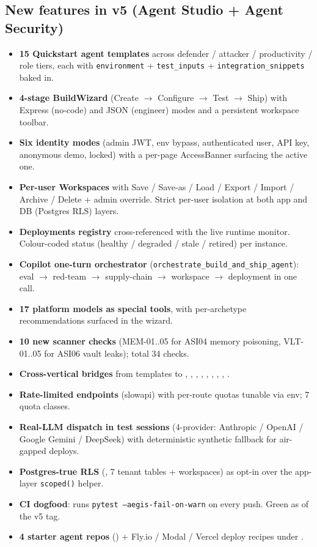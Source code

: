 \documentclass[11pt,a4paper]{article}
\begin{document}
\subsection*{New features in v5 (Agent Studio + Agent Security)}
\begin{itemize}[leftmargin=1.2em,itemsep=1pt]
\item \textbf{15 Quickstart agent templates} across defender / attacker / productivity / role tiers, each with \texttt{environment} + \texttt{test\_inputs} + \texttt{integration\_snippets} baked in.
\item \textbf{4-stage BuildWizard} (Create $\to$ Configure $\to$ Test $\to$ Ship) with Express (no-code) and JSON (engineer) modes and a persistent workspace toolbar.
\item \textbf{Six identity modes} (admin JWT, env bypass, authenticated user, API key, anonymous demo, locked) with a per-page AccessBanner surfacing the active one.
\item \textbf{Per-user Workspaces} with Save / Save-as / Load / Export / Import / Archive / Delete + admin override. Strict per-user isolation at both app and DB (Postgres RLS) layers.
\item \textbf{Deployments registry} cross-referenced with the live runtime monitor. Colour-coded status (healthy / degraded / stale / retired) per instance.
\item \textbf{Copilot one-turn orchestrator} (\texttt{orchestrate\_build\_and\_ship\_agent}): eval $\to$ red-team $\to$ supply-chain $\to$ workspace $\to$ deployment in one call.
\item \textbf{17 platform models as special tools}, with per-archetype recommendations surfaced in the wizard.
\item \textbf{10 new scanner checks} (MEM-01..05 for ASI04 memory poisoning, VLT-01..05 for ASI06 vault leaks); total 34 checks.
\item \textbf{Cross-vertical bridges} from templates to , , , , , , , , .
\item \textbf{Rate-limited endpoints} (slowapi) with per-route quotas tunable via env; 7 quota classes.
\item \textbf{Real-LLM dispatch in test sessions} (4-provider: Anthropic / OpenAI / Google Gemini / DeepSeek) with deterministic synthetic fallback for air-gapped deploys.
\item \textbf{Postgres-true RLS} (, 7 tenant tables + workspaces) as opt-in over the app-layer \texttt{scoped()} helper.
\item \textbf{CI dogfood}:  runs \texttt{pytest --aegis-fail-on-warn} on every push. Green as of the v5 tag.
\item \textbf{4 starter agent repos} () $+$ Fly.io / Modal / Vercel deploy recipes under .
\end{itemize}
\end{document}
